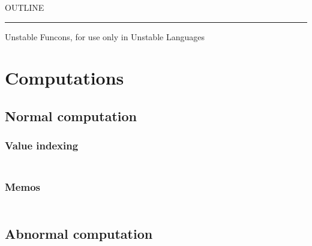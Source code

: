


    OUTLINE
  \tableofcontents
\begin{center}
\rule{3in}{0.4pt}
\end{center}

Unstable Funcons, for use only in Unstable Languages

\section{Computations}\hypertarget{computations}{}\label{computations}

\subsection{Normal computation}\hypertarget{normal-computation}{}\label{normal-computation}

\subsubsection{Value indexing}\hypertarget{value-indexing}{}\label{value-indexing}

\begin{align*}
  [ \
  \KEY{Funcon} \quad & \NAMEHYPER{../../../../../Unstable-Funcons-beta/Computations/Normal}{Indexing}{allocate-index} \\
  \KEY{Funcon} \quad & \NAMEHYPER{../../../../../Unstable-Funcons-beta/Computations/Normal}{Indexing}{lookup-index}
  \ ]
\end{align*}
\subsubsection{Memos}\hypertarget{memos}{}\label{memos}

\begin{align*}
  [ \
  \KEY{Funcon} \quad & \NAMEHYPER{../../../../../Unstable-Funcons-beta/Computations/Normal}{Memos}{initialise-memos} \\
  \KEY{Funcon} \quad & \NAMEHYPER{../../../../../Unstable-Funcons-beta/Computations/Normal}{Memos}{memo-value} \\
  \KEY{Funcon} \quad & \NAMEHYPER{../../../../../Unstable-Funcons-beta/Computations/Normal}{Memos}{memo-value-recall}
  \ ]
\end{align*}
\subsection{Abnormal computation}\hypertarget{abnormal-computation}{}\label{abnormal-computation}

